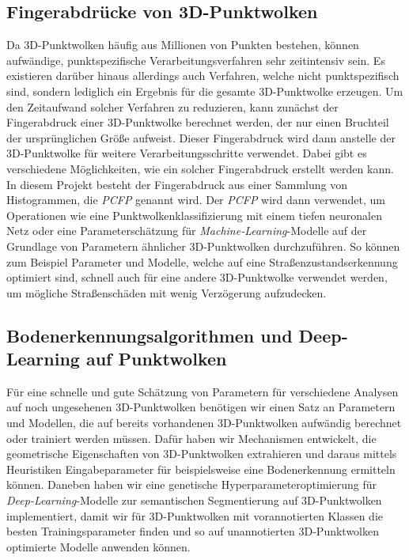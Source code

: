 \subsection{Fingerabdrücke von 3D-Punktwolken}

Da 3D-Punktwolken häufig aus Millionen von Punkten bestehen, können aufwändige, punktspezifische Verarbeitungsverfahren sehr zeitintensiv sein. Es existieren darüber hinaus allerdings auch Verfahren, welche nicht punktspezifisch sind, sondern lediglich ein Ergebnis für die gesamte 3D-Punktwolke erzeugen. Um den Zeitaufwand solcher Verfahren zu reduzieren, kann zunächst der Fingerabdruck einer 3D-Punktwolke berechnet werden, der nur einen Bruchteil der ursprünglichen Größe aufweist. Dieser Fingerabdruck wird dann anstelle der 3D-Punktwolke für weitere Verarbeitungsschritte verwendet. Dabei gibt es verschiedene Möglichkeiten, wie ein solcher Fingerabdruck erstellt werden kann. In diesem Projekt besteht der Fingerabdruck aus einer Sammlung von Histogrammen, die \textit{PCFP} genannt wird. Der \textit{PCFP} wird dann verwendet, um Operationen wie eine Punktwolkenklassifizierung mit einem tiefen neuronalen Netz oder eine Parameterschätzung für \textit{Machine-Learning}-Modelle auf der Grundlage von Parametern ähnlicher 3D-Punktwolken durchzuführen. So können zum Beispiel Parameter und Modelle, welche auf eine Straßenzustandserkennung optimiert sind, schnell auch für eine andere 3D-Punktwolke verwendet werden, um mögliche Straßenschäden mit wenig Verzögerung aufzudecken.

\subsection{Bodenerkennungsalgorithmen und Deep-Learning auf Punktwolken}

Für eine schnelle und gute Schätzung von Parametern für verschiedene Analysen auf noch ungesehenen 3D-Punktwolken benötigen wir einen Satz an Parametern und Modellen, die auf bereits vorhandenen 3D-Punktwolken aufwändig berechnet oder trainiert werden müssen. Dafür haben wir Mechanismen entwickelt, die geometrische Eigenschaften von 3D-Punktwolken extrahieren und daraus mittels Heuristiken Eingabeparameter für beispielsweise eine Bodenerkennung ermitteln können. Daneben haben wir eine genetische Hyperparameteroptimierung für \textit{Deep-Learning}-Modelle zur semantischen Segmentierung auf 3D-Punktwolken implementiert, damit wir für 3D-Punktwolken mit vorannotierten Klassen die besten Trainingsparameter finden und so auf unannotierten 3D-Punktwolken optimierte Modelle anwenden können.

